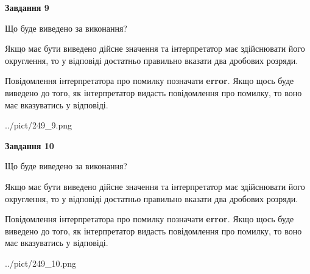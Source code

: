 \documentclass[12pt, ukrainian]{article}
\begin{document}
{\begin {Large}
{\begin {center}\textbf{Завдання 9}\end {center}}\par
Що буде виведено за виконання? \par

Якщо має бути виведено дійсне значення та інтерпретатор має здійснювати його округлення, 
то у відповіді достатньо правильно вказати два дробових розряди.

Повідомлення інтерпретатора про помилку позначати \textbf{error}.
Якщо щось буде виведено до того, як інтерпретатор видасть повідомлення про помилку, 
то воно має вказуватись у відповіді. \par

\begin{center}
	{../pict/249_9.png}
\end{center}
\newpage

{\begin {center}\textbf{Завдання 10}\end {center}}\par
Що буде виведено за виконання? \par

Якщо має бути виведено дійсне значення та інтерпретатор має здійснювати його округлення, 
то у відповіді достатньо правильно вказати два дробових розряди.

Повідомлення інтерпретатора про помилку позначати \textbf{error}.
Якщо щось буде виведено до того, як інтерпретатор видасть повідомлення про помилку, 
то воно має вказуватись у відповіді. \par

\begin{center}
	{../pict/249_10.png}
\end{center}
\newpage

\end {Large}}
\end{document}
